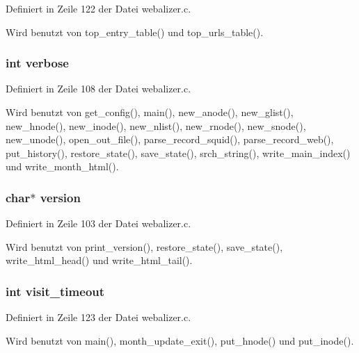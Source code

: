 Definiert in Zeile 122 der Datei webalizer.c.

Wird benutzt von top\_\-entry\_\-table() und top\_\-urls\_\-table().
\subsubsection{\setlength{\rightskip}{0pt plus 5cm}int {\bf verbose}}\label{webalizer_8h_0b2caeb4b6f130be43e5a2f0267dd453}




Definiert in Zeile 108 der Datei webalizer.c.

Wird benutzt von get\_\-config(), main(), new\_\-anode(), new\_\-glist(), new\_\-hnode(), new\_\-inode(), new\_\-nlist(), new\_\-rnode(), new\_\-snode(), new\_\-unode(), open\_\-out\_\-file(), parse\_\-record\_\-squid(), parse\_\-record\_\-web(), put\_\-history(), restore\_\-state(), save\_\-state(), srch\_\-string(), write\_\-main\_\-index() und write\_\-month\_\-html().
\subsubsection{\setlength{\rightskip}{0pt plus 5cm}char$\ast$ {\bf version}}\label{webalizer_8h_56abfaab87c46691c1ef3ad0df23e864}




Definiert in Zeile 103 der Datei webalizer.c.

Wird benutzt von print\_\-version(), restore\_\-state(), save\_\-state(), write\_\-html\_\-head() und write\_\-html\_\-tail().
\subsubsection{\setlength{\rightskip}{0pt plus 5cm}int {\bf visit\_\-timeout}}\label{webalizer_8h_95c29ea4f1f207b5be0cdd3cefa935d1}




Definiert in Zeile 123 der Datei webalizer.c.

Wird benutzt von main(), month\_\-update\_\-exit(), put\_\-hnode() und put\_\-inode().